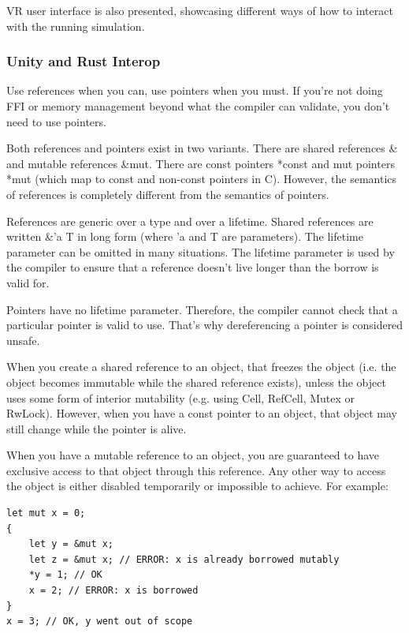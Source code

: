VR user interface is also presented, showcasing different ways of how to interact with the running simulation. 


\subsubsection{Unity and Rust Interop}



Use references when you can, use pointers when you must. If you're not doing FFI or memory management beyond what the compiler can validate, you don't need to use pointers.

Both references and pointers exist in two variants. There are shared references \& and mutable references \&mut. There are const pointers *const and mut pointers *mut (which map to const and non-const pointers in C). However, the semantics of references is completely different from the semantics of pointers.

References are generic over a type and over a lifetime. Shared references are written \&'a T in long form (where 'a and T are parameters). The lifetime parameter can be omitted in many situations. The lifetime parameter is used by the compiler to ensure that a reference doesn't live longer than the borrow is valid for.

Pointers have no lifetime parameter. Therefore, the compiler cannot check that a particular pointer is valid to use. That's why dereferencing a pointer is considered unsafe.

When you create a shared reference to an object, that freezes the object (i.e. the object becomes immutable while the shared reference exists), unless the object uses some form of interior mutability (e.g. using Cell, RefCell, Mutex or RwLock). However, when you have a const pointer to an object, that object may still change while the pointer is alive.

When you have a mutable reference to an object, you are guaranteed to have exclusive access to that object through this reference. Any other way to access the object is either disabled temporarily or impossible to achieve. For example:

\begin{lstlisting}
let mut x = 0;
{
	let y = &mut x;
	let z = &mut x; // ERROR: x is already borrowed mutably
	*y = 1; // OK
	x = 2; // ERROR: x is borrowed
}
x = 3; // OK, y went out of scope
\end{lstlisting}

